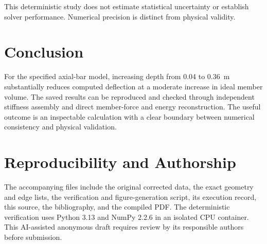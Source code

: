 \documentclass[conference]{IEEEtran}
\begin{document}
This deterministic study does not estimate statistical uncertainty or establish solver performance. Numerical precision is distinct from physical validity.

\section{Conclusion}
For the specified axial-bar model, increasing depth from 0.04 to 0.36~m substantially reduces computed deflection at a moderate increase in ideal member volume. The saved results can be reproduced and checked through independent stiffness assembly and direct member-force and energy reconstruction. The useful outcome is an inspectable calculation with a clear boundary between numerical consistency and physical validation.

\section*{Reproducibility and Authorship}
The accompanying files include the original corrected data, the exact geometry and edge lists, the verification and figure-generation script, its execution record, this source, the bibliography, and the compiled PDF. The deterministic verification uses Python 3.13 and NumPy 2.2.6 in an isolated CPU container. This AI-assisted anonymous draft requires review by its responsible authors before submission.



\end{document}
